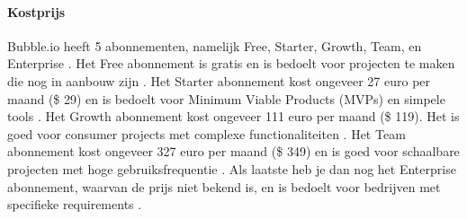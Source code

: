 \paragraph{Kostprijs}
Bubble.io heeft 5 abonnementen, namelijk Free, Starter, Growth, Team, en Enterprise \autocite{Bubble2024}.
Het Free abonnement is gratis en is bedoelt voor projecten te maken die nog in aanbouw zijn \autocite{Bubble2024}.
Het Starter abonnement kost ongeveer 27 euro per maand (\$ 29) en is bedoelt voor Minimum Viable Products (MVPs) en simpele tools \autocite{Bubble2024}.
Het Growth abonnement kost ongeveer 111 euro per maand (\$ 119). Het is goed voor consumer projects met complexe functionaliteiten \autocite{Bubble2024}.
Het Team abonnement kost ongeveer 327 euro per maand (\$ 349) en is goed voor schaalbare projecten met hoge gebruiksfrequentie \autocite{Bubble2024}. Als laatste heb je dan nog
het Enterprise abonnement, waarvan de prijs niet bekend is, en is bedoelt voor bedrijven met specifieke requirements \autocite{Bubble2024}.

